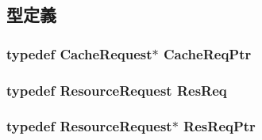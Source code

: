 \subsection{型定義}
\hypertarget{resource_8hh_a846cef203ab93202ce46ec7a798c96b8}{
\subsubsection[{CacheReqPtr}]{\setlength{\rightskip}{0pt plus 5cm}typedef {\bf CacheRequest}$\ast$ {\bf CacheReqPtr}}}
\label{resource_8hh_a846cef203ab93202ce46ec7a798c96b8}
\hypertarget{resource_8hh_add9cca5e4344952e69384bf72b3b3941}{
\subsubsection[{ResReq}]{\setlength{\rightskip}{0pt plus 5cm}typedef {\bf ResourceRequest} {\bf ResReq}}}
\label{resource_8hh_add9cca5e4344952e69384bf72b3b3941}
\hypertarget{resource_8hh_a57185e394b4c95ed634366fa05807555}{
\subsubsection[{ResReqPtr}]{\setlength{\rightskip}{0pt plus 5cm}typedef {\bf ResourceRequest}$\ast$ {\bf ResReqPtr}}}
\label{resource_8hh_a57185e394b4c95ed634366fa05807555}

